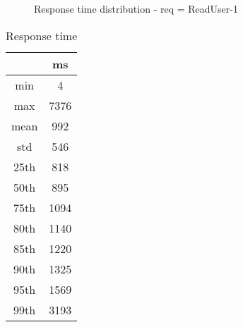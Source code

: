 \begin{minipage}{0.75\linewidth}
\begin{figure}[h]
\begin{adjustbox}{max width=1.0\linewidth, keepaspectratio}
  \end{adjustbox}
  \caption{Response time distribution - req = ReadUser-1}
\end{figure}
\end{minipage}\hfill\begin{minipage}{0.18\linewidth}
\begin{table}[h]
\begin{tabular}{|cc|}
\hline
\textbf{} & \textbf{ms}\\ \hline
 \Xhline{0.005\arrayrulewidth}
min & 4\\
 \Xhline{0.005\arrayrulewidth}
max & 7376\\
 \Xhline{0.005\arrayrulewidth}
mean & 992\\
 \Xhline{0.005\arrayrulewidth}
std & 546\\
\hline
\hline
 \Xhline{0.005\arrayrulewidth}
25th & 818\\
 \Xhline{0.005\arrayrulewidth}
50th & 895\\
 \Xhline{0.005\arrayrulewidth}
75th & 1094\\
 \Xhline{0.005\arrayrulewidth}
80th & 1140\\
 \Xhline{0.005\arrayrulewidth}
85th & 1220\\
 \Xhline{0.005\arrayrulewidth}
90th & 1325\\
 \Xhline{0.005\arrayrulewidth}
95th & 1569\\
 \Xhline{0.005\arrayrulewidth}
99th & 3193\\
\hline
\end{tabular}
\caption{Response time}
\end{table}
\end{minipage}\hfill